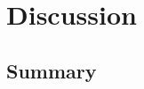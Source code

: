 \documentclass{article}
\newcommand{\mB}{\mathcal{B}}
\newcommand{\mM}{\mathcal{M}}
\newcommand{\PP}{\mathbb{P}}           %
\providecommand{\mc}[1]{\mathcal{#1}}
\providecommand{\mh}[1]{\widehat{#1}}
\providecommand{\mt}[1]{\widetilde{#1}}
\newcommand{\argmin}{\operatornamewithlimits{argmin}}
\newcommand{\MeB}{\mM \overset{\varepsilon}{{\sim}}_{\PP} \mB}
\providecommand{\norm}[1]{\left \lVert#1 \right  \rVert}
\newcommand{\T}{^{\ensuremath{\mathsf{T}}}}           %
\begin{document}
% 
% 
% 
% 
% 
% 
% 
% 
% 

\section{Discussion}

\subsection{Summary} %
\label{par:summary}
\end{document}
